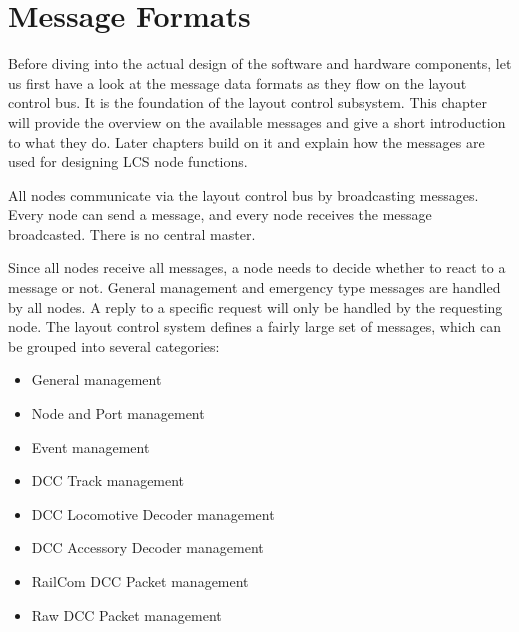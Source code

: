 \chapter{Message Formats}

Before diving into the actual design of the software and hardware components, let us first have a look at the message data formats as they flow on the layout control bus. It is the foundation of the layout control subsystem. This chapter will provide the overview on the available messages and give a short introduction to what they do. Later chapters build on it and explain how the messages are used for designing LCS node functions. 

All nodes communicate via the layout control bus by broadcasting messages. Every node can send a message, and every node receives the message broadcasted. There is no central master. 

\begin{center}
\end{center}

Since all nodes receive all messages, a node needs to decide whether to react to a message or not. General management and emergency type messages are handled by all nodes. A reply to a specific request will only be handled by the requesting node. The layout control system defines a fairly large set of messages, which can be grouped into several categories:

\begin{itemize}
    \item General management
    \item Node and Port management
    \item Event management
    \item DCC Track management
    \item DCC Locomotive Decoder management
    \item DCC Accessory Decoder management
    \item RailCom DCC Packet management
    \item Raw DCC Packet management
\end{itemize}

